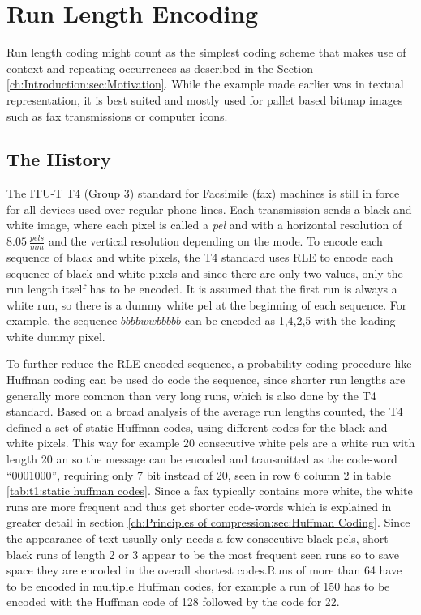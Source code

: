\section{Run Length Encoding}
\label{ch:Principles of compression:sec:Run Length Encoding}
\par{
	Run length coding might count as the simplest coding scheme that makes use of context and repeating occurrences as described in the Section \ref{ch:Introduction:sec:Motivation}. While the example made earlier was in textual representation, it is best suited and mostly used for pallet based bitmap images \cite{palette-image} such as fax transmissions or computer icons.
}

\subsection{The History}
\label{ch:Principles of compression:sec:Run Length Encoding:subSec:History}
\par{
 The ITU-T T4 (Group 3) standard for Facsimile (fax) machines \cite{ITU} is still in force for all devices used over regular phone lines. Each transmission sends a black and white image, where each pixel is called a \textit{pel} and with a horizontal resolution of $8.05 \: \frac{pels}{mm}$ and the vertical resolution depending on the mode. To encode each sequence of black and white pixels, the T4 standard uses RLE to encode each sequence of black and white pixels and since there are only two values, only the run length itself has to be encoded. It is assumed that the first run is always a white run, so there is a dummy white pel at the beginning of each sequence. For example, the sequence $bbbbwwbbbbb$ can be encoded as 1,4,2,5 with the leading white dummy pixel.
}
\par{
To further reduce the RLE encoded sequence, a probability coding procedure like Huffman coding can be used do code the sequence, since shorter run lengths are generally more common than very long runs, which is also done by the T4 standard. Based on a broad analysis of the average run lengths counted, the T4 defined a set of static Huffman codes, using different codes for the black and white pixels. This way for example 20 consecutive white pels  are a white run with length 20 an so the message can be encoded and transmitted as the code-word \enquote{0001000}, requiring only 7 bit instead of 20, seen in row 6 column 2 in table \ref{tab:t1:static huffman codes}. Since a fax typically contains more white, the white runs are more frequent and thus get shorter code-words which is explained in greater detail in section \ref{ch:Principles of compression:sec:Huffman Coding}. Since the appearance of text usually only needs a few consecutive black pels, short black runs of length 2 or 3 appear to be the most frequent seen runs so to save space they are encoded in the overall shortest codes.Runs of more than 64 have to be encoded in multiple Huffman codes, for example a run of 150 has to be encoded with the Huffman code of 128 followed by the code for 22.
}
